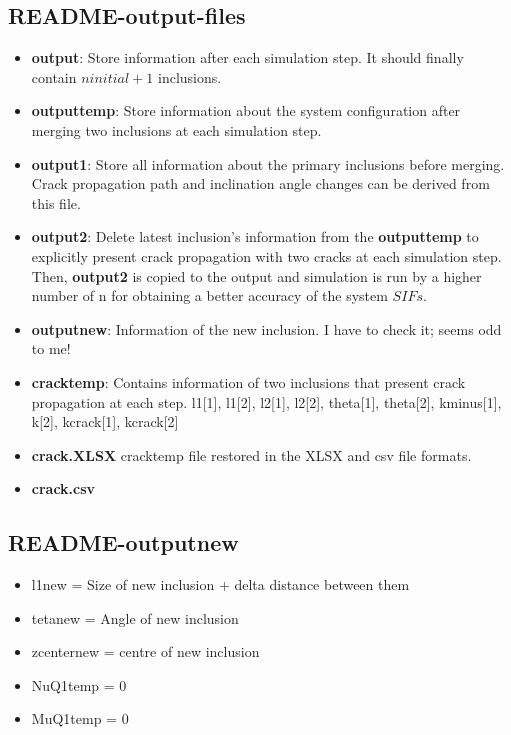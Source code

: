 \documentclass[12pt]{article}
\numberwithin{equation}{subsection}
\begin{document}
\clearpage
\subsection{README-output-files}

\begin{itemize}

\item \textbf{output}: Store information after each simulation step. It should finally contain $ninitial +1$ inclusions.

\item \textbf{outputtemp}: Store information about the system configuration after merging two inclusions at each simulation step.

\item \textbf{output1}: Store all information about the primary inclusions before merging. Crack propagation path and inclination angle changes can be derived from this file.

\item \textbf{output2}:  Delete latest inclusion's information from the \textbf{outputtemp} to explicitly present crack propagation with two cracks at each simulation step. Then, \textbf{output2} is copied to the output and simulation is run by a higher number of n for obtaining a better accuracy of the system $SIFs$.

\item \textbf{outputnew}: Information of the new inclusion. I have to check it; seems odd to me!

\item \textbf{cracktemp}: Contains information of two inclusions that present crack propagation at each step. {{l1[1], l1[2], l2[1], l2[2], theta[1], theta[2], kminus[1], k[2], kcrack[1], kcrack[2]}}
%
\item \textbf{crack.XLSX} cracktemp file restored in the XLSX and csv file formats. 
%
\item \textbf{crack.csv}

\end{itemize}

\clearpage
\subsection{README-outputnew}

\begin{itemize}
\item l1new  = Size of new inclusion + delta distance between them
\item tetanew = Angle of new inclusion 
\item zcenternew = centre of new inclusion
\item NuQ1temp = 0
\item MuQ1temp = 0
\end{itemize}
\end{document}
